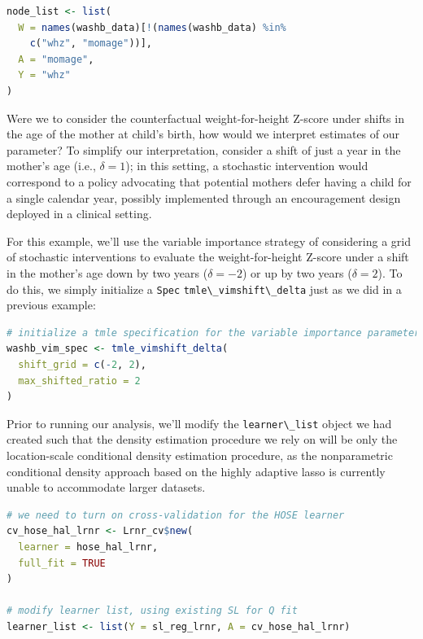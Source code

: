 \documentclass[
  12pt, krantz2,
]{krantz}
\newcommand{\passthrough}[1]{#1}
\newcommand{\1}{\mathbbm{1}}
\theoremstyle{definition}
\theoremstyle{definition}
\theoremstyle{definition}
\theoremstyle{definition}
\theoremstyle{remark}
\begin{document}
\begin{lstlisting}[language=R]
node_list <- list(
  W = names(washb_data)[!(names(washb_data) %in%
    c("whz", "momage"))],
  A = "momage",
  Y = "whz"
)
\end{lstlisting}

Were we to consider the counterfactual weight-for-height Z-score under shifts in
the age of the mother at child's birth, how would we interpret estimates of our
parameter? To simplify our interpretation, consider a shift of just a year in
the mother's age (i.e., \(\delta = 1\)); in this setting, a stochastic
intervention would correspond to a policy advocating that potential mothers
defer having a child for a single calendar year, possibly implemented through an
encouragement design deployed in a clinical setting.

For this example, we'll use the variable importance strategy of considering a
grid of stochastic interventions to evaluate the weight-for-height Z-score under
a shift in the mother's age down by two years (\(\delta = -2\)) or up by two years
(\(\delta = 2\)). To do this, we simply initialize a \passthrough{\lstinline!Spec!} \passthrough{\lstinline!tmle\_vimshift\_delta!}
just as we did in a previous example:

\begin{lstlisting}[language=R]
# initialize a tmle specification for the variable importance parameter
washb_vim_spec <- tmle_vimshift_delta(
  shift_grid = c(-2, 2),
  max_shifted_ratio = 2
)
\end{lstlisting}

Prior to running our analysis, we'll modify the \passthrough{\lstinline!learner\_list!} object we had
created such that the density estimation procedure we rely on will be only the
location-scale conditional density estimation procedure, as the nonparametric
conditional density approach based on the highly adaptive lasso \citep{diaz2011super, benkeser2016hal, coyle2020hal9001, hejazi2020hal9001, hejazi2020haldensify}
is currently unable to accommodate larger datasets.

\begin{lstlisting}[language=R]
# we need to turn on cross-validation for the HOSE learner
cv_hose_hal_lrnr <- Lrnr_cv$new(
  learner = hose_hal_lrnr,
  full_fit = TRUE
)

# modify learner list, using existing SL for Q fit
learner_list <- list(Y = sl_reg_lrnr, A = cv_hose_hal_lrnr)
\end{lstlisting}
\end{document}
